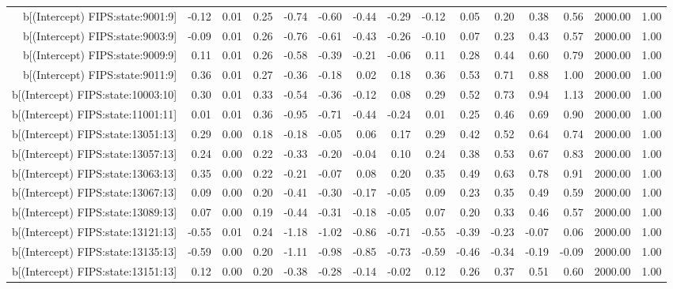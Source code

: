 \begin{table}[ht]
\begin{tabular}{rrrrrrrrrrrrrrr}
  b[(Intercept) FIPS:state:9001:9] & -0.12 & 0.01 & 0.25 & -0.74 & -0.60 & -0.44 & -0.29 & -0.12 & 0.05 & 0.20 & 0.38 & 0.56 & 2000.00 & 1.00 \\ 
  b[(Intercept) FIPS:state:9003:9] & -0.09 & 0.01 & 0.26 & -0.76 & -0.61 & -0.43 & -0.26 & -0.10 & 0.07 & 0.23 & 0.43 & 0.57 & 2000.00 & 1.00 \\ 
  b[(Intercept) FIPS:state:9009:9] & 0.11 & 0.01 & 0.26 & -0.58 & -0.39 & -0.21 & -0.06 & 0.11 & 0.28 & 0.44 & 0.60 & 0.79 & 2000.00 & 1.00 \\ 
  b[(Intercept) FIPS:state:9011:9] & 0.36 & 0.01 & 0.27 & -0.36 & -0.18 & 0.02 & 0.18 & 0.36 & 0.53 & 0.71 & 0.88 & 1.00 & 2000.00 & 1.00 \\ 
  b[(Intercept) FIPS:state:10003:10] & 0.30 & 0.01 & 0.33 & -0.54 & -0.36 & -0.12 & 0.08 & 0.29 & 0.52 & 0.73 & 0.94 & 1.13 & 2000.00 & 1.00 \\ 
  b[(Intercept) FIPS:state:11001:11] & 0.01 & 0.01 & 0.36 & -0.95 & -0.71 & -0.44 & -0.24 & 0.01 & 0.25 & 0.46 & 0.69 & 0.90 & 2000.00 & 1.00 \\ 
  b[(Intercept) FIPS:state:13051:13] & 0.29 & 0.00 & 0.18 & -0.18 & -0.05 & 0.06 & 0.17 & 0.29 & 0.42 & 0.52 & 0.64 & 0.74 & 2000.00 & 1.00 \\ 
  b[(Intercept) FIPS:state:13057:13] & 0.24 & 0.00 & 0.22 & -0.33 & -0.20 & -0.04 & 0.10 & 0.24 & 0.38 & 0.53 & 0.67 & 0.83 & 2000.00 & 1.00 \\ 
  b[(Intercept) FIPS:state:13063:13] & 0.35 & 0.00 & 0.22 & -0.21 & -0.07 & 0.08 & 0.20 & 0.35 & 0.49 & 0.63 & 0.78 & 0.91 & 2000.00 & 1.00 \\ 
  b[(Intercept) FIPS:state:13067:13] & 0.09 & 0.00 & 0.20 & -0.41 & -0.30 & -0.17 & -0.05 & 0.09 & 0.23 & 0.35 & 0.49 & 0.59 & 2000.00 & 1.00 \\ 
  b[(Intercept) FIPS:state:13089:13] & 0.07 & 0.00 & 0.19 & -0.44 & -0.31 & -0.18 & -0.05 & 0.07 & 0.20 & 0.33 & 0.46 & 0.57 & 2000.00 & 1.00 \\ 
  b[(Intercept) FIPS:state:13121:13] & -0.55 & 0.01 & 0.24 & -1.18 & -1.02 & -0.86 & -0.71 & -0.55 & -0.39 & -0.23 & -0.07 & 0.06 & 2000.00 & 1.00 \\ 
  b[(Intercept) FIPS:state:13135:13] & -0.59 & 0.00 & 0.20 & -1.11 & -0.98 & -0.85 & -0.73 & -0.59 & -0.46 & -0.34 & -0.19 & -0.09 & 2000.00 & 1.00 \\ 
  b[(Intercept) FIPS:state:13151:13] & 0.12 & 0.00 & 0.20 & -0.38 & -0.28 & -0.14 & -0.02 & 0.12 & 0.26 & 0.37 & 0.51 & 0.60 & 2000.00 & 1.00 \\ 

\end{tabular}
\end{table}
